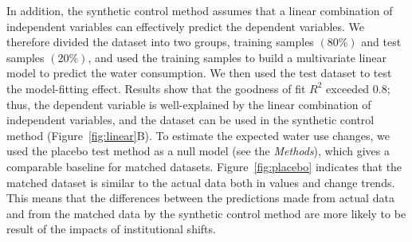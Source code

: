 In addition, the synthetic control method assumes that a linear combination of independent variables can effectively predict the dependent variables.
We therefore divided the dataset into two groups, training samples $(80\%)$ and test samples $(20\%)$, and used the training samples to build a multivariate linear model to predict the water consumption. We then used the test dataset to test the model-fitting effect.
Results show that the goodness of fit $R^2$ exceeded $0.8$; thus, the dependent variable is well-explained by the linear combination of independent variables, and the dataset can be used in the synthetic control method (Figure~\ref{fig:linear}B).
To estimate the expected water use changes, we used the placebo test method as a null model (see the \textit{Methods}), which gives a comparable baseline for matched datasets.
Figure~\ref{fig:placebo} indicates that the matched dataset is similar to the actual data both in values and change trends. This means that the differences between the predictions made from actual data and from the matched data by the synthetic control method are more likely to be result of the impacts of institutional shifts.

